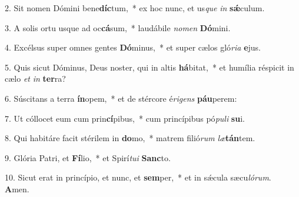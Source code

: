 2. Sit nomen Dómini bene\textbf{díc}tum,~*  ex hoc nunc, et us\textit{que} \textit{in} \textbf{sǽ}culum.\

3. A solis ortu usque ad oc\textbf{cá}sum,~*  laudábile \textit{no}\textit{men} \textbf{Dó}mini.\

4. Excélsus super omnes gentes \textbf{Dó}minus,~*  et super cælos gló\textit{ri}\textit{a} \textbf{e}jus.\

5. Quis sicut Dóminus, Deus noster, qui in altis \textbf{há}bitat,~*  et humília réspicit in cælo \textit{et} \textit{in} \textbf{ter}ra?\

6. Súscitans a terra \textbf{ín}opem,~*  et de stércore é\textit{ri}\textit{gens} \textbf{páu}perem:\

7. Ut cóllocet eum cum prin\textbf{cí}pibus,~*  cum princípibus pó\textit{pu}\textit{li} \textbf{su}i.\

8. Qui habitáre facit stérilem in \textbf{do}mo,~*  matrem filió\textit{rum} \textit{læ}\textbf{tán}tem.\

9. Glória Patri, et \textbf{Fí}lio,~*  et Spirí\textit{tu}\textit{i} \textbf{Sanc}to.\

10. Sicut erat in princípio, et nunc, et \textbf{sem}per,~*  et in sǽcula sæcu\textit{ló}\textit{rum}. \textbf{A}men.\

